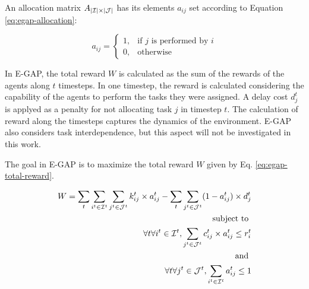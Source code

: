 \documentclass[conference]{IEEEtran}
\begin{document}
An allocation matrix $A_{|\mathcal{I}| \times |\mathcal{J}|}$ has its elements $a_{ij}$ set according to Equation \ref{eq:egap-allocation}:

\begin{equation}
\label{eq:egap-allocation}
a_{ij} = 
\begin{cases}
  1,& \text{if } j \text{ is performed by } i\\
  0,& \text{otherwise}
\end{cases}
\end{equation}

% 
In E-GAP, the total reward $W$ is calculated as the sum of the rewards of the agents along $t$ timesteps. In one timestep, the reward is calculated considering the capability of the agents to perform the tasks they were assigned. A delay cost $d_j^t$ is applyed as a penalty for not allocating task $j$ in timestep $t$. The calculation of reward along the timesteps captures the dynamics of the environment. E-GAP also considers task interdependence, but this aspect will not be investigated in this work. 

The goal in E-GAP is to maximize the total reward $W$ given by Eq. \ref{eq:egap-total-reward}. %

\begin{equation}
\label{eq:egap-total-reward}
\begin{split}
W = \sum_t \sum_{i^t \in \agentset^t} \sum_{j^t \in \taskset^t} k_{ij}^t \times a_{ij}^t - 
\sum_t \sum_{j^t \in \taskset^t}(1 - a_{ij}^t) \times d_j^t\\
\text{ subject to }\\
\forall t \forall i^t \in \agentset^t, \sum_{j^t \in \taskset^t} \rescspt{i}{j}^t \times a_{ij}^t \leq \agtres{i}^t \\
\text{ and }\\
\forall t \forall j^t \in \taskset^t, \sum_{i^t \in \agentset^t} a_{ij}^t \leq 1
\end{split}
\end{equation}
\end{document}
